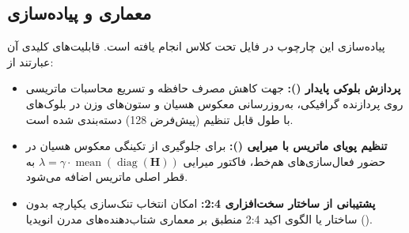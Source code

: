 \subsection{معماری و پیاده‌سازی}
پیاده‌سازی این چارچوب در فایل  تحت کلاس  انجام یافته است. قابلیت‌های کلیدی آن عبارتند از:
\begin{itemize}
    \item \textbf{پردازش بلوکی پایدار ():} جهت کاهش مصرف حافظه و تسریع محاسبات ماتریسی روی پردازنده گرافیکی، به‌روزرسانی معکوس هسیان و ستون‌های وزن در بلوک‌های با طول قابل تنظیم (پیش‌فرض 128) دسته‌بندی شده است.
    \item \textbf{تنظیم پویای ماتریس با میرایی ():} برای جلوگیری از تکینگی معکوس هسیان در حضور فعال‌سازی‌های هم‌خط، فاکتور میرایی $\lambda = \gamma \cdot \operatorname{mean}(\operatorname{diag}(\mathbf{H}))$ به قطر اصلی ماتریس اضافه می‌شود.
    \item \textbf{پشتیبانی از ساختار سخت‌افزاری 2:4:} امکان انتخاب تنک‌سازی یکپارچه بدون ساختار یا الگوی اکید 2:4 منطبق بر معماری شتاب‌دهنده‌های مدرن انویدیا ().
\end{itemize}
